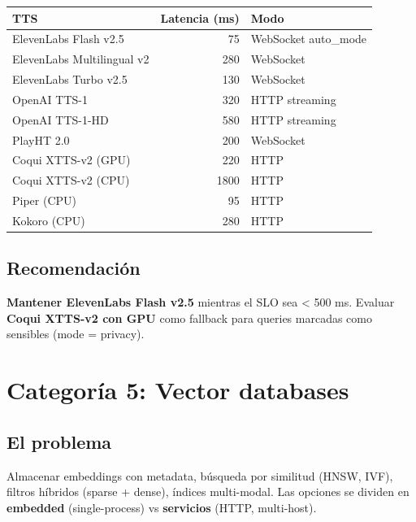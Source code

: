 \documentclass[11pt,a4paper]{article}
\begin{document}
\begin{center}
\begin{tabular}{|l|r|l|}
\hline
\rowcolor{sotared}\color{white}\textbf{TTS} & \color{white}\textbf{Latencia (ms)} & \color{white}\textbf{Modo}\\
\hline
ElevenLabs Flash v2.5 & 75 & WebSocket auto\_mode\\
ElevenLabs Multilingual v2 & 280 & WebSocket\\
ElevenLabs Turbo v2.5 & 130 & WebSocket\\
OpenAI TTS-1 & 320 & HTTP streaming\\
OpenAI TTS-1-HD & 580 & HTTP streaming\\
PlayHT 2.0 & 200 & WebSocket\\
Coqui XTTS-v2 (GPU) & 220 & HTTP\\
Coqui XTTS-v2 (CPU) & 1800 & HTTP\\
Piper (CPU) & 95 & HTTP\\
Kokoro (CPU) & 280 & HTTP\\
\hline
\end{tabular}
\end{center}

\subsection{Recomendación}

\textbf{Mantener ElevenLabs Flash v2.5} mientras el SLO sea < 500 ms. Evaluar \textbf{Coqui XTTS-v2 con GPU} como fallback para queries marcadas como sensibles (mode = privacy).

\newpage

\section{Categoría 5: Vector databases}

\subsection{El problema}

Almacenar embeddings con metadata, búsqueda por similitud (HNSW, IVF), filtros híbridos (sparse + dense), índices multi-modal. Las opciones se dividen en \textbf{embedded} (single-process) vs \textbf{servicios} (HTTP, multi-host).
\end{document}
